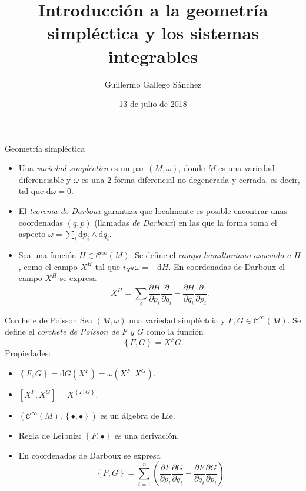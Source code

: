 \documentclass[mathserif]{beamer}
\title{Introducción a la geometría simpléctica y los sistemas integrables}
\author{Guillermo Gallego Sánchez}
\institute{Departamento de Álgebra, Geometría y Topología}
\date{13 de julio de 2018}
\newcommand{\dd}{\mathrm{d}}
\begin{document}
\begin{frame}
  \maketitle
\end{frame}
\begin{frame}{Geometría simpléctica}
  \begin{itemize}
    \item  Una \emph{variedad simpléctica} es un par $(M,\omega)$, donde $M$ es una variedad diferenciable y $\omega$ es una $2$-forma diferencial no degenerada y cerrada, es decir, tal que $\mathrm{d}\omega=0$.

    \item  El \emph{teorema de Darboux} garantiza que localmente es posible encontrar unas coordenadas $(q,p)$ (llamadas \emph{de Darboux}) en las que la forma toma el aspecto $\omega=\sum_i \mathrm{d}p_i \wedge \mathrm{d}q_i$.

    \item Sea una función $H\in \mathscr{C}^{\infty}(M) $. Se define el \emph{campo hamiltoniano asociado a} $H$, como el campo $X^H$ tal que $i_{X^H}\omega=-\mathrm{d}H$. En coordenadas de Darboux el campo $X^H$ se expresa
   \begin{equation*}
     X^H=\sum_i \frac{\partial H}{\partial p_i}\frac{\partial}{\partial q_i}-\frac{\partial H}{\partial q_i}\frac{\partial}{\partial p_i}.
   \end{equation*}
  \end{itemize}
\end{frame}

\begin{frame}{Corchete de Poisson}
  Sea $(M,\omega)$ una variedad simpléctcia y $F,G\in \mathscr{C}^{\infty}(M)$. Se define el \emph{corchete de Poisson de $F$ y $G$} como la función
  \begin{equation*}
    \left\{ F,G \right\}=X^FG.
  \end{equation*}
  Propiedades:
  \begin{itemize}
    \item $\left\{ F,G \right\}=\dd G(X^F)=\omega(X^F,X^G)$.
    \item $\left[ X^F,X^G \right]=X^{\left\{ F,G \right\}}$.
    \item $(\mathscr{C}^{\infty}(M),\left\{\bullet,\bullet \right\})$ es un álgebra de Lie.
    \item Regla de Leibniz: $\left\{ F,\bullet \right\}$ es una derivación. 
    \item En coordenadas de Darboux se expresa
      \begin{equation*}
	\left\{ F,G \right\}=\sum_{i=1}^n\left( \frac{\partial F}{\partial p_i}\frac{\partial G}{\partial q_i}- \frac{\partial F}{\partial q_i}\frac{\partial G}{\partial p_i} \right)
      \end{equation*}
  \end{itemize}
\end{frame}
\end{document}
